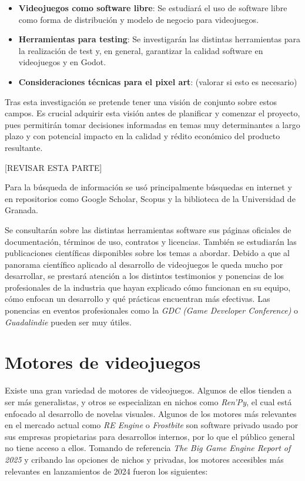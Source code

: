 \begin{itemize}
    \item \textbf{Videojuegos como software libre}: Se estudiará el uso de software libre como forma de distribución y modelo de negocio para videojuegos.
    
    \item \textbf{Herramientas para testing}: Se investigarán las distintas herramientas para la realización de test y, en general, garantizar la calidad software en videojuegos y en Godot.
    
    \item \textbf{Consideraciones técnicas para el pixel art}: (valorar si esto es necesario)

\end{itemize} 

Tras esta investigación se pretende tener una visión de conjunto sobre estos campos. Es crucial adquirir esta visión antes de planificar y comenzar el proyecto, pues permitirán tomar decisiones informadas en temas muy determinantes a largo plazo y con potencial impacto en la calidad y rédito económico del producto resultante.


[REVISAR ESTA PARTE]


Para la búsqueda de información se usó principalmente búsquedas en internet y en repositorios como Google Scholar, Scopus y la biblioteca de la Universidad de Granada.

Se consultarán sobre las distintas herramientas software sus páginas oficiales de documentación, términos de uso, contratos y licencias. También se estudiarán las publicaciones científicas disponibles sobre los temas a abordar. Debido a que al panorama científico aplicado al desarrollo de videojuegos le queda mucho por desarrollar, se prestará atención a los distintos testimonios y ponencias de los profesionales de la industria que hayan explicado cómo funcionan en su equipo, cómo enfocan un desarrollo y qué prácticas encuentran más efectivas. Las ponencias en eventos profesionales como la \textit{GDC (Game Developer Conference)} o \textit{Guadalindie} pueden ser muy útiles.

\section{Motores de videojuegos}

Existe una gran variedad de motores de videojuegos. Algunos de ellos tienden a ser más generalistas, y otros se especializan en nichos como \textit{Ren'Py}\cite{renpy}, el cual está enfocado al desarrollo de novelas visuales. Algunos de los motores más relevantes en el mercado actual como \textit{RE Engine} o \textit{Frostbite} son software privado usado por sus empresas propietarias para desarrollos internos, por lo que el público general no tiene acceso a ellos. Tomando de referencia \textit{The Big Game Engine Report of 2025}\cite{game-engine-report} y cribando las opciones de nichos y privadas, los motores accesibles más relevantes en lanzamientos de 2024 fueron los siguientes:

